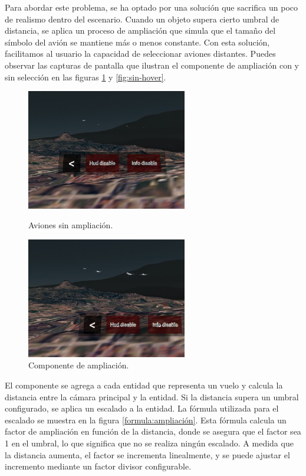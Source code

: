 \documentclass[a4paper, 11pt]{book}
\begin{document}
Para abordar este problema, se ha optado por una solución que sacrifica un poco de realismo dentro del escenario. Cuando un objeto supera cierto umbral de distancia, se aplica un proceso de ampliación que simula que el tamaño del símbolo del avión se mantiene más o menos constante. Con esta solución, facilitamos al usuario la capacidad de seleccionar aviones distantes. Puedes observar las capturas de pantalla que ilustran el componente de ampliación con y sin selección en las figuras \ref{fig:con-hover} y \ref{fig:sin-hover}.
\begin{figure}[H]
  \begin{minipage}[t]{0.5\linewidth}
    \centering
    \includegraphics[width=7cm, keepaspectratio]{img/sin_hover.jpg}
    \caption{Aviones sin ampliación.}
    \label{fig:sin-hover}
  \end{minipage}%
  \begin{minipage}[t]{0.5\linewidth}
    \centering
    \includegraphics[width=7cm, keepaspectratio]{img/con_hover.jpg}
    \caption{Componente de ampliación.}
    \label{fig:con-hover}    
  \end{minipage}
\end{figure}
El componente se agrega a cada entidad que representa un vuelo y calcula la distancia entre la cámara principal y la entidad. Si la distancia supera un umbral configurado, se aplica un escalado a la entidad. La fórmula utilizada para el escalado se muestra en la figura \ref{formula:ampliación}. Esta fórmula calcula un factor de ampliación en función de la distancia, donde se asegura que el factor sea 1 en el umbral, lo que significa que no se realiza ningún escalado. A medida que la distancia aumenta, el factor se incrementa linealmente, y se puede ajustar el incremento mediante un factor divisor configurable. 
\end{document}
